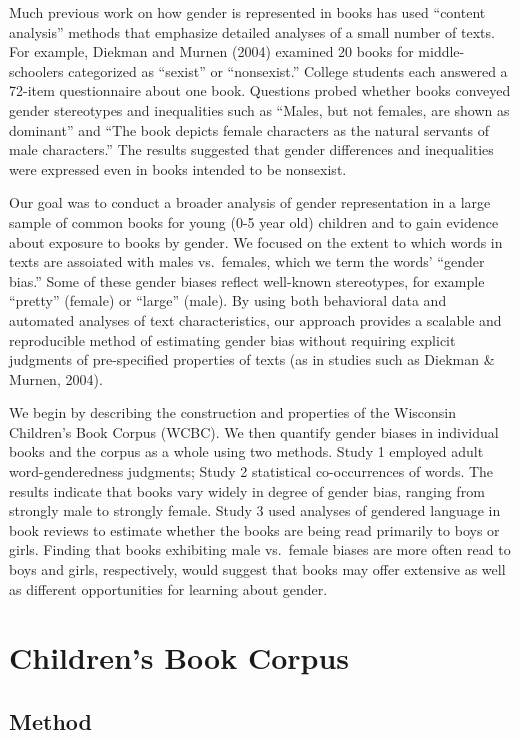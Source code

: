 \documentclass[
  english,
  ,man,floatsintext]{apa6}
\begin{document}
Much previous work on how gender is represented in books has used ``content analysis'' methods that emphasize detailed analyses of a small number of texts. For example, Diekman and Murnen (2004) examined 20 books for middle-schoolers categorized as ``sexist'' or ``nonsexist.'' College students each answered a 72-item questionnaire about one book. Questions probed whether books conveyed gender stereotypes and inequalities such as ``Males, but not females, are shown as dominant'' and ``The book depicts female characters as the natural servants of male characters.'' The results suggested that gender differences and inequalities were expressed even in books intended to be nonsexist.

Our goal was to conduct a broader analysis of gender representation in a large sample of common books for young (0-5 year old) children and to gain evidence about exposure to books by gender. We focused on the extent to which words in texts are assoiated with males vs.~females, which we term the words' ``gender bias.'' Some of these gender biases reflect well-known stereotypes, for example ``pretty'' (female) or ``large'' (male). By using both behavioral data and automated analyses of text characteristics, our approach provides a scalable and reproducible method of estimating gender bias without requiring explicit judgments of pre-specified properties of texts (as in studies such as Diekman \& Murnen, 2004).

We begin by describing the construction and properties of the Wisconsin Children's Book Corpus (WCBC). We then quantify gender biases in individual books and the corpus as a whole using two methods. Study 1 employed adult word-genderedness judgments; Study 2 statistical co-occurrences of words. The results indicate that books vary widely in degree of gender bias, ranging from strongly male to strongly female. Study 3 used analyses of gendered language in book reviews to estimate whether the books are being read primarily to boys or girls. Finding that books exhibiting male vs.~female biases are more often read to boys and girls, respectively, would suggest that books may offer extensive as well as different opportunities for learning about gender.

\hypertarget{childrens-book-corpus}{%
\section{Children's Book Corpus}\label{childrens-book-corpus}}

\hypertarget{method}{%
\subsection{Method}\label{method}}
\end{document}
